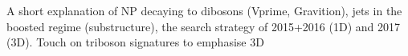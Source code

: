 A short explanation of NP decaying to dibosons (Vprime, Gravition), jets in the boosted regime (substructure), the search strategy of 2015+2016 (1D) and 2017 (3D).
Touch on triboson signatures to emphasise 3D